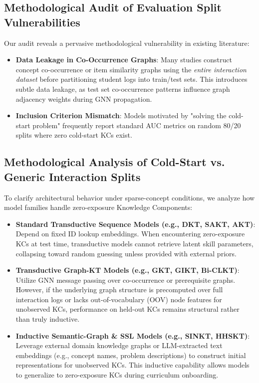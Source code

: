 \documentclass[10pt,journal,compsoc]{IEEEtran}
\begin{document}
\subsection{Methodological Audit of Evaluation Split Vulnerabilities}
Our audit reveals a pervasive methodological vulnerability in existing literature:
\begin{itemize}
    \item \textbf{Data Leakage in Co-Occurrence Graphs}: Many studies construct concept co-occurrence or item similarity graphs using the \emph{entire interaction dataset} before partitioning student logs into train/test sets. This introduces subtle data leakage, as test set co-occurrence patterns influence graph adjacency weights during GNN propagation.
    \item \textbf{Inclusion Criterion Mismatch}: Models motivated by "solving the cold-start problem" frequently report standard AUC metrics on random 80/20 splits where zero cold-start KCs exist.
\end{itemize}

\subsection{Methodological Analysis of Cold-Start vs. Generic Interaction Splits}
To clarify architectural behavior under sparse-concept conditions, we analyze how model families handle zero-exposure Knowledge Components:
\begin{itemize}
    \item \textbf{Standard Transductive Sequence Models (e.g., DKT, SAKT, AKT)}: Depend on fixed ID lookup embeddings. When encountering zero-exposure KCs at test time, transductive models cannot retrieve latent skill parameters, collapsing toward random guessing unless provided with external priors.
    \item \textbf{Transductive Graph-KT Models (e.g., GKT, GIKT, Bi-CLKT)}: Utilize GNN message passing over co-occurrence or prerequisite graphs. However, if the underlying graph structure is precomputed over full interaction logs or lacks out-of-vocabulary (OOV) node features for unobserved KCs, performance on held-out KCs remains structural rather than truly inductive.
    \item \textbf{Inductive Semantic-Graph \& SSL Models (e.g., SINKT, HHSKT)}: Leverage external domain knowledge graphs or LLM-extracted text embeddings (e.g., concept names, problem descriptions) to construct initial representations for unobserved KCs. This inductive capability allows models to generalize to zero-exposure KCs during curriculum onboarding.
\end{itemize}
\end{document}
